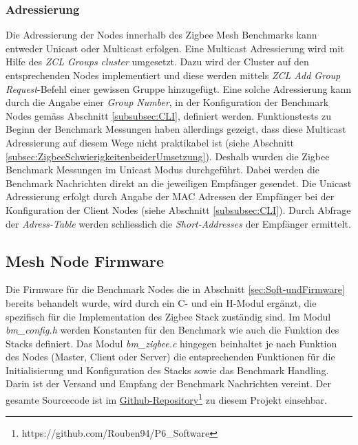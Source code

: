 \subsubsection{Adressierung}\label{subsubsec:Adressierung}
Die Adressierung der Nodes innerhalb des Zigbee Mesh Benchmarks kann entweder Unicast oder Multicast erfolgen.
Eine Multicast Adressierung wird mit Hilfe des \textit{ZCL Groups cluster} umgesetzt.
Dazu wird der Cluster auf den entsprechenden Nodes implementiert und diese werden mittels \textit{ZCL Add Group Request}-Befehl einer gewissen Gruppe hinzugefügt.
Eine solche Adressierung kann durch die Angabe einer \textit{Group Number}, in der Konfiguration der Benchmark Nodes gemäss Abschnitt \ref{subsubsec:CLI}, definiert werden.
Funktionstests zu Beginn der Benchmark Messungen haben allerdings gezeigt, dass diese Multicast Adressierung auf diesem Wege nicht praktikabel ist (siehe Abschnitt \ref{subsec:ZigbeeSchwierigkeitenbeiderUmsetzung}).
Deshalb wurden die Zigbee Benchmark Messungen im Unicast Modus durchgeführt.
Dabei werden die Benchmark Nachrichten direkt an die jeweiligen Empfänger gesendet.
Die Unicast Adressierung erfolgt durch Angabe der MAC Adressen der Empfänger bei der Konfiguration der Client Nodes (siehe Abschnitt \ref{subsubsec:CLI}).
Durch Abfrage der \textit{Adress-Table} werden schliesslich die \textit{Short-Addresses} der Empfänger ermittelt.


\subsection{Mesh Node Firmware}\label{subsec:ZigbeeMeshNodeFirmware}
Die Firmware für die Benchmark Nodes die in Abschnitt \ref{sec:Soft-undFirmware} bereits behandelt wurde, wird durch ein C- und ein H-Modul ergänzt, die spezifisch für die Implementation des Zigbee Stack zuständig sind.
Im Modul \textit{bm\_config.h} werden Konstanten für den Benchmark wie auch die Funktion des Stacks definiert.
Das Modul \textit{bm\_zigbee.c} hingegen beinhaltet je nach Funktion des Nodes (Master, Client oder Server) die entsprechenden Funktionen für die Initialisierung und Konfiguration des Stacks sowie das Benchmark Handling.
Darin ist der Versand und Empfang der Benchmark Nachrichten vereint.
Der gesamte Sourcecode ist im \href{https://github.com/Rouben94/P6_Software}{Github-Repository\footnote{\url{https://github.com/Rouben94/P6_Software}\cite{anklin_bobst_horath_rouben94p6_software_nodate}}} zu diesem Projekt einsehbar.

